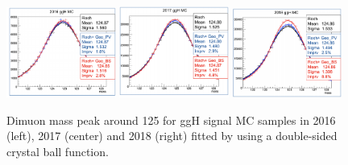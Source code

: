 \begin{figure}[h!]
    \centering
    \includegraphics[width=0.32\textwidth]{images_geofit/ggH_mass_geofit_2016.png}
    \includegraphics[width=0.32\textwidth]{images_geofit/ggH_mass_geofit_2017.png}
    \includegraphics[width=0.32\textwidth]{images_geofit/ggH_mass_geofit_2018.png}
    \caption{Dimuon mass peak around 125 \gev for ggH signal MC samples in 2016 (left), 2017 (center) and 2018 (right) fitted by using a double-sided crystal ball function.}
    \label{fig:ggH_dimu_mass_geofit}
\end{figure}





